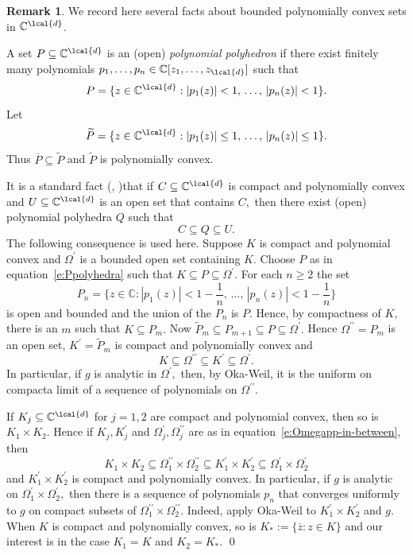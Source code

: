 \documentclass[a4paper,reqno,index]{amsart}
\newcommand{\df}[1]{{\textit{#1}}{\index{#1}}}
\numberwithin{equation}{section}
\newcommand{\CC}{\mathbb{C}}
\newcommand{\ol}[1]{\overline{#1}}
\theoremstyle{definition}
\newtheorem{remark}[theorem]{Remark}
\begin{document}
\begin{remark}\rm
 \label{r:polycvx}
  We record here several facts about bounded polynomially convex  sets in $\CC^{\lcal{d}}$. 
  
  A set $P\subseteq \CC^{\lcal{d}}$ is an (open) \df{polynomial polyhedron} if there exist
  finitely many polynomials $p_1,\dots,p_n\in \CC[z_1,\dots,z_{\lcal{d}}]$ such that
\begin{equation} 
 \label{e:Ppolyhedra}
 P =\{z\in \CC^{\lcal{d}} : |p_1(z)|<1, \, \dots, \, |p_n(z)| < 1\}.
\end{equation}
Let 
\[
 \widetilde{P} =\{z\in \CC^{\lcal{d}}: |p_1(z)|\le 1, \,  \dots, \, |p_n(z)|\le 1\}.
\]
 Thus $\ol{P}\subseteq \widetilde{P}$ and $\widetilde{P}$ is polynomially convex. 
 
 It is a standard fact (\cite[Theorem 9, p.42]{Boas}, \cite{StoutPolyCvx})that if  $C\subseteq \CC^{\lcal{d}}$ is compact and polynomially convex and $U\subseteq\CC^{\lcal{d}}$
 is an open set that contains $C,$ then there exist (open) polynomial polyhedra  $Q$ such that
\[
  C\subseteq Q \subseteq U.
\]
 The following consequence is used here.  Suppose $K$ is 
 compact and polynomial convex and $\Omega^\prime$ is 
 a bounded   open set containing $K.$  Choose $P$ as in 
 equation~\eqref{e:Ppolyhedra}  such that $K\subseteq P \subseteq \Omega^\prime.$ For each $n\ge 2$ the set
\[
  P_n =\{z\in \CC: |p_1(z)|<1-\frac{1}{n}, \,  \dots, \, |p_n(z)|< 1-\frac{1}{n}\}
\]
 is open and bounded and the union of the $P_n$ is $P.$ Hence, by compactness of $K,$ there is an $m$ such that
 $K\subseteq P_m.$ Now $\widetilde{P}_m \subseteq P_{m+1}\subseteq P \subseteq \Omega^\prime.$  Hence $\Omega^{\prime\prime}=P_m$
 is an open set, $K^\prime=\widetilde{P}_m$  is compact and polynomially convex  and
\begin{equation}
    \label{e:Omegapp-in-between}
      K\subseteq \Omega^{\prime\prime} \subseteq K^\prime 
       \subseteq \Omega^\prime.
\end{equation}
 In particular, if $g$ is analytic in $\Omega^\prime,$
 then,  by Oka-Weil, it is the uniform on compacta limit of a sequence
 of polynomials on $\Omega^{\prime\prime}.$  
   
 If $K_j\subseteq \CC^{\lcal{d}}$ for $j=1,2$ are  compact and polynomial convex, then so is $K_1\times K_2.$  Hence if $K_j, K_j^\prime$ and
 $\Omega_j^\prime, \Omega_j^{\prime\prime}$ are as in
 equation~\eqref{e:Omegapp-in-between}, then
\[
 K_1\times K_2 \subseteq \Omega_1^{\prime\prime} \times \Omega_2^{\prime\prime} \subseteq K_1^\prime \times K_2^\prime \subseteq \Omega_1^\prime\times \Omega_2^\prime
\]
 and $K_1^\prime \times K_2^\prime$ is  compact  and polynomially convex. 
 In particular, if $g$ is analytic on $\Omega_1^{\prime}\times \Omega_2^{\prime},$ then there is a sequence of polynomials $p_n$ that
 converges uniformly to $g$ on compact subsets of $\Omega_1^{\prime\prime} \times \Omega_2^{\prime\prime}$. Indeed, apply Oka-Weil to $K_1^\prime\times K_2^\prime$ and $g$. When $K$ is compact and polynomially convex, so is $K_*:=\{\overline{z}:z\in K\}$ and our
 interest is in the case $K_1=K$ and $K_2=K_*.$ 
\qed
\end{remark}
\end{document}
